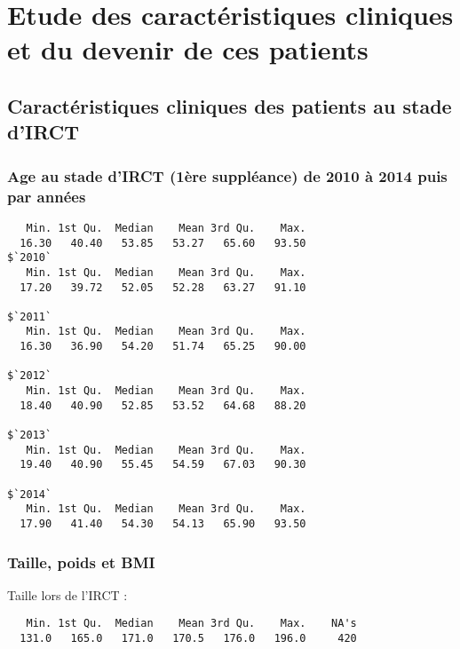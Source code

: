 \documentclass[11pt,a4paper]{article}\usepackage[]{graphicx}\usepackage[]{color}
\makeatletter
\newenvironment{kframe}{%
 \def\at@end@of@kframe{}%
 \ifinner\ifhmode%
  \def\at@end@of@kframe{\end{minipage}}%
  \begin{minipage}{\columnwidth}%
 \fi\fi%
 \def\FrameCommand##1{\hskip\@totalleftmargin \hskip-\fboxsep
 \colorbox{shadecolor}{##1}\hskip-\fboxsep
     \hskip-\linewidth \hskip-\@totalleftmargin \hskip\columnwidth}%
 \MakeFramed {\advance\hsize-\width
   \@totalleftmargin\z@ \linewidth\hsize
   \@setminipage}}%
 {\par\unskip\endMakeFramed%
 \at@end@of@kframe}
\newenvironment{knitrout}{}{} %
\makeatother
\begin{document}
\section{Etude des caractéristiques cliniques et du devenir de ces patients}

  \subsection{Caractéristiques cliniques des patients au stade d’IRCT}
  
    \subsubsection{Age au stade d’IRCT (1ère suppléance) de 2010 à 2014 puis par années}

\begin{knitrout}
\color{fgcolor}\begin{kframe}
\begin{verbatim}
   Min. 1st Qu.  Median    Mean 3rd Qu.    Max. 
  16.30   40.40   53.85   53.27   65.60   93.50 
$`2010`
   Min. 1st Qu.  Median    Mean 3rd Qu.    Max. 
  17.20   39.72   52.05   52.28   63.27   91.10 

$`2011`
   Min. 1st Qu.  Median    Mean 3rd Qu.    Max. 
  16.30   36.90   54.20   51.74   65.25   90.00 

$`2012`
   Min. 1st Qu.  Median    Mean 3rd Qu.    Max. 
  18.40   40.90   52.85   53.52   64.68   88.20 

$`2013`
   Min. 1st Qu.  Median    Mean 3rd Qu.    Max. 
  19.40   40.90   55.45   54.59   67.03   90.30 

$`2014`
   Min. 1st Qu.  Median    Mean 3rd Qu.    Max. 
  17.90   41.40   54.30   54.13   65.90   93.50 
\end{verbatim}
\end{kframe}
\end{knitrout}

    \subsubsection{Taille, poids et BMI}
  
  Taille lors de l'IRCT :
  
\begin{knitrout}
\color{fgcolor}\begin{kframe}
\begin{verbatim}
   Min. 1st Qu.  Median    Mean 3rd Qu.    Max.    NA's 
  131.0   165.0   171.0   170.5   176.0   196.0     420 
\end{verbatim}
\end{kframe}
\end{knitrout}
\end{document}
